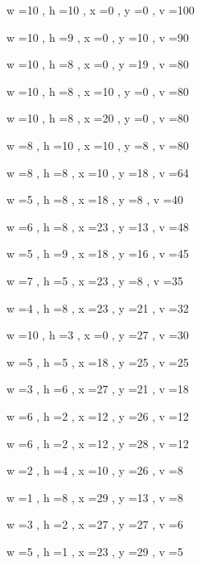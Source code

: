 \documentclass[11pt]{article}
\begin{document}
w =10 , h =10 , x =0 , y =0 , v =100
\par
w =10 , h =9 , x =0 , y =10 , v =90
\par
w =10 , h =8 , x =0 , y =19 , v =80
\par
w =10 , h =8 , x =10 , y =0 , v =80
\par
w =10 , h =8 , x =20 , y =0 , v =80
\par
w =8 , h =10 , x =10 , y =8 , v =80
\par
w =8 , h =8 , x =10 , y =18 , v =64
\par
w =5 , h =8 , x =18 , y =8 , v =40
\par
w =6 , h =8 , x =23 , y =13 , v =48
\par
w =5 , h =9 , x =18 , y =16 , v =45
\par
w =7 , h =5 , x =23 , y =8 , v =35
\par
w =4 , h =8 , x =23 , y =21 , v =32
\par
w =10 , h =3 , x =0 , y =27 , v =30
\par
w =5 , h =5 , x =18 , y =25 , v =25
\par
w =3 , h =6 , x =27 , y =21 , v =18
\par
w =6 , h =2 , x =12 , y =26 , v =12
\par
w =6 , h =2 , x =12 , y =28 , v =12
\par
w =2 , h =4 , x =10 , y =26 , v =8
\par
w =1 , h =8 , x =29 , y =13 , v =8
\par
w =3 , h =2 , x =27 , y =27 , v =6
\par
w =5 , h =1 , x =23 , y =29 , v =5
\par
\newpage


\end{document}
